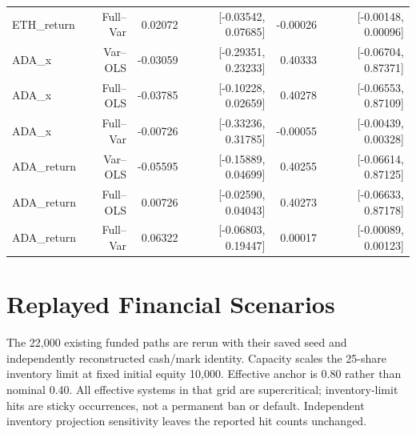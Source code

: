 \documentclass[10pt]{article}
\begin{document}
\begin{longtable}{lrrrrr}
ETH\_return & Full--Var & 0.02072 & [-0.03542, 0.07685] & -0.00026 & [-0.00148, 0.00096] \\
ADA\_x & Var--OLS & -0.03059 & [-0.29351, 0.23233] & 0.40333 & [-0.06704, 0.87371] \\
ADA\_x & Full--OLS & -0.03785 & [-0.10228, 0.02659] & 0.40278 & [-0.06553, 0.87109] \\
ADA\_x & Full--Var & -0.00726 & [-0.33236, 0.31785] & -0.00055 & [-0.00439, 0.00328] \\
ADA\_return & Var--OLS & -0.05595 & [-0.15889, 0.04699] & 0.40255 & [-0.06614, 0.87125] \\
ADA\_return & Full--OLS & 0.00726 & [-0.02590, 0.04043] & 0.40273 & [-0.06633, 0.87178] \\
ADA\_return & Full--Var & 0.06322 & [-0.06803, 0.19447] & 0.00017 & [-0.00089, 0.00123] \\
\bottomrule\end{longtable}\normalsize

\section{Replayed Financial Scenarios}
The 22,000 existing funded paths are rerun with their saved seed and independently reconstructed cash/mark identity. Capacity scales the 25-share inventory limit at fixed initial equity 10,000. Effective anchor is 0.80 rather than nominal 0.40. All effective systems in that grid are supercritical; inventory-limit hits are sticky occurrences, not a permanent ban or default. Independent inventory projection sensitivity leaves the reported hit counts unchanged.
\end{document}
